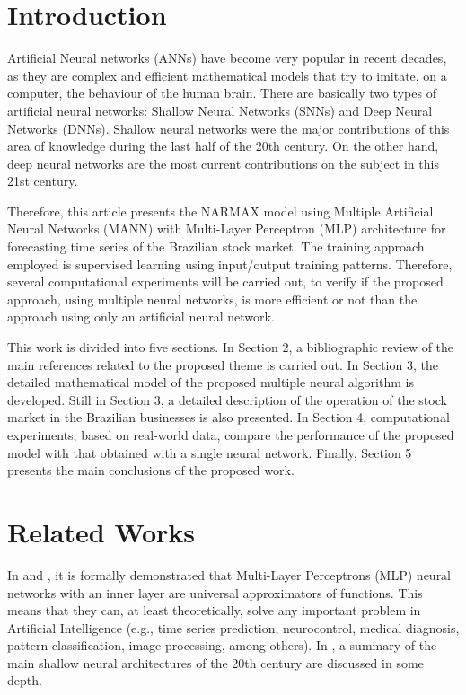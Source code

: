 \documentclass[journal,article,submit,pdftex,moreauthors]{Definitions/mdpi}
\begin{document}

\section{Introduction}

 

Artificial Neural networks (ANNs) have become very popular in recent decades, as they are complex and efficient mathematical models that try to imitate, on a computer, the behaviour of the human brain. There are basically two types of artificial neural networks: Shallow Neural Networks (SNNs) and Deep Neural Networks (DNNs). Shallow neural networks were the major contributions of this area of knowledge during the last half of the 20th century. On the other hand, deep neural networks are the most current contributions on the subject in this 21st century.

Therefore, this article presents the NARMAX model using Multiple Artificial Neural Networks (MANN) with Multi-Layer Perceptron (MLP) architecture for forecasting time series of the Brazilian stock market. The training approach employed is supervised learning using input/output training patterns. Therefore, several computational experiments will be carried out, to verify if the proposed approach, using multiple neural networks, is more efficient or not than the approach using only an artificial neural network.

This work is divided into five sections. In Section 2, a bibliographic review of the main references related to the proposed theme is carried out. In Section 3, the detailed mathematical model of the proposed multiple neural algorithm is developed. Still in Section 3, a detailed description of the operation of the stock market in the Brazilian businesses is also presented. In Section 4, computational experiments, based on real-world data, compare the performance of the proposed model with that obtained with a single neural network. Finally, Section 5 presents the main conclusions of the proposed work.  


\section{Related Works}

In \cite{ref1} and \cite{ref2}, it is formally demonstrated that Multi-Layer Perceptrons (MLP) neural networks with an inner layer are universal approximators of functions. This means that they can, at least theoretically, solve any important problem in Artificial Intelligence (e.g., time series prediction, neurocontrol, medical diagnosis, pattern classification, image processing, among others). In \cite{ref3}, a summary of the main shallow neural architectures of the 20th century are discussed in some depth.
\end{document}
